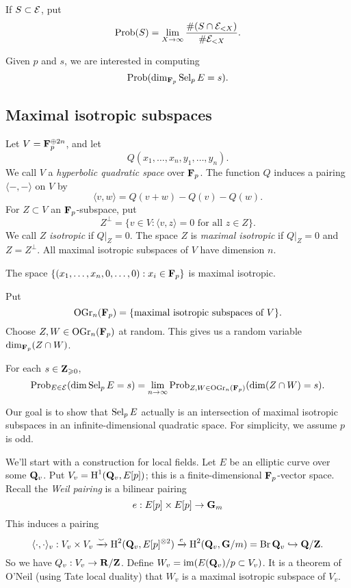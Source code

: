 \begin{definition}
If $S\subset \mathcal{E}$, put 
\[
  \operatorname{Prob}(S)= \lim_{X\to \infty} \frac{\#(S\cap \mathcal{E}_{<X})}{\# \mathcal{E}_{<X}} .
\]
\end{definition}

Given $p$ and $s$, we are interested in computing 
\[
  \operatorname{Prob}(\dim_{\mathbf{F}_p} \operatorname{Sel}_p E = s) .
\]





\subsection{Maximal isotropic subspaces}

Let $V=\mathbf{F}_p^{\oplus 2 n}$, and let 
\[
  Q(x_1,\dots,x_n,y_1,\dots,y_n) .
\]
We call $V$ a \emph{hyperbolic quadratic space} over $\mathbf{F}_p$. The function $Q$ 
induces a pairing $\langle-,-\rangle$ on $V$ by 
\[
  \langle v,w\rangle = Q(v+w)-Q(v)-Q(w) .
\]
For $Z\subset V$ an $\mathbf{F}_p$-subspace, put 
\[
  Z^\bot = \{v\in V:\langle v,z\rangle = 0\text{ for all }z\in Z\} .
\]
We call $Z$ \emph{isotropic} if $Q|_Z=0$. The space $Z$ is \emph{maximal 
isotropic} if $Q|_Z=0$ and $Z=Z^\bot$. All maximal isotropic subspaces of $V$ 
have dimension $n$. 

\begin{example}
The space $\{(x_1,\dots,x_n,0,\dots,0):x_i\in \mathbf{F}_p\}$ is maximal isotropic. 
\end{example}

Put 
\[
  \operatorname{OGr}_n(\mathbf{F}_p) = \{\text{maximal isotropic subspaces of $V$}\} .
\]
Choose $Z,W\in \operatorname{OGr}_n(\mathbf{F}_p)$ at random. This gives us a random 
variable $\dim_{\mathbf{F}_p}(Z\cap W)$. 

\begin{conjecture}
For each $s\in \mathbf{Z}_{\geqslant 0}$, 
\[
  \operatorname{Prob}_{E\in \mathcal{E}} (\dim \operatorname{Sel}_p E=s) = \lim_{n\to \infty} \operatorname{Prob}_{Z,W\in \operatorname{OGr}_n(\mathbf{F}_p)}(\dim(Z\cap W)=s) .
\]
\end{conjecture}

Our goal is to show that $\operatorname{Sel}_p E$ actually is an intersection of maximal 
isotropic subspaces in an infinite-dimensional quadratic space. For simplicity, 
we assume $p$ is odd. 

We'll start with a construction for local fields. Let $E$ be an elliptic curve 
over some $\mathbf{Q}_v$. Put $V_v=\operatorname{H}^1(\mathbf{Q}_v,E[p])$; this is a finite-dimensional 
$\mathbf{F}_p$-vector space. Recall the \emph{Weil pairing} is a bilinear pairing  
\[
  e:E[p]\times E[p] \to \mathbf{G}_m
\]
This induces a pairing 
\[
  \langle\cdot,\cdot\rangle_v:V_v\times V_v\xrightarrow\smallsmile \operatorname{H}^2(\mathbf{Q}_v,E[p]^{\otimes 2}) \xrightarrow e \operatorname{H}^2(\mathbf{Q}_v,\mathbf{G}/m) = \operatorname{Br}\mathbf{Q}_v\hookrightarrow\mathbf{Q}/\mathbf{Z} .
\]
So we have $Q_v:V_v\to \mathbf{R}/\mathbf{Z}$. Define $W_v=\operatorname{im}(E(\mathbf{Q}_v)/p\subset V_v)$. It is 
a theorem of O'Neil (using Tate local duality) that $W_v$ is a maximal isotropic 
subspace of $V_v$. 

